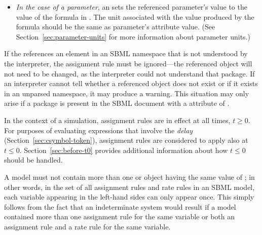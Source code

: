 \begin{itemize}
\item \emph{In the case of a parameter}, an \AssignmentRule sets
  the referenced parameter's value to the value of the formula in
  .  The unit associated with the value produced by
  the formula should be the same as parameter's 
  attribute value.  (See Section~\ref{sec:parameter-units} for
  more information about parameter units.)


\end{itemize}


\begin{blockChanged}
If the  references an element in an SBML namespace that is not
  understood by the interpreter, the assignment rule must be ignored---the 
  referenced object will not need to be changed, as the interpreter could not
  understand that package.  If an interpreter cannot tell whether 
  a referenced object does not exist or if it exists in an unparsed namespace,
  it may produce a warning.  This situation may only arise if a package is present in the SBML document with a  attribute of .
\end{blockChanged}

In the context of a simulation, assignment rules are in effect at
all times, $t \geq 0$.  For purposes of evaluating expressions
that involve the \emph{delay} 
(Section~\ref{sec:csymbol-token}), assignment rules are considered
to apply also at $t \leq 0$.  Section~\ref{sec:before-t0} provides
additional information about how $t \leq 0$ should be
  handled.

A model must not contain more than one \AssignmentRule or
\RateRule object having the same value of ; in
other words, in the set of all assignment rules and rate rules in
an SBML model, each variable appearing in the left-hand sides can
only appear once.  This simply follows from the fact that an
indeterminate system would result if a model contained more than
one assignment rule for the same variable or both an assignment
rule and a rate rule for the same variable.

